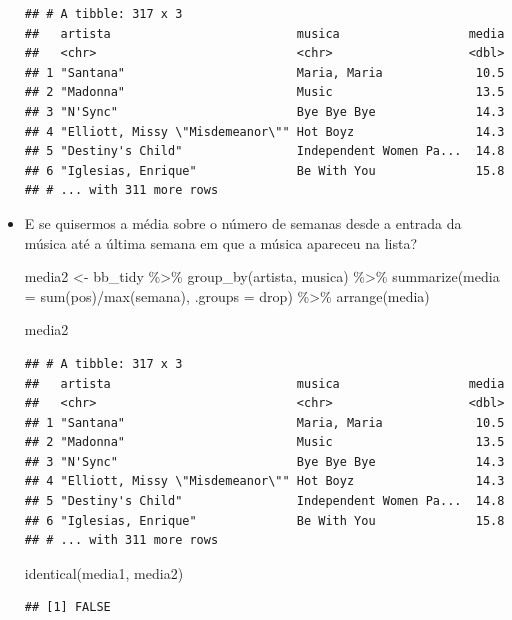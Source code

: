 \documentclass[
  11pt]{report}
\newenvironment{Shaded}{\begin{snugshade}}{\end{snugshade}}
\newcommand{\AttributeTok}[1]{\textcolor[rgb]{0.77,0.63,0.00}{#1}}
\newcommand{\FunctionTok}[1]{\textcolor[rgb]{0.00,0.00,0.00}{#1}}
\newcommand{\NormalTok}[1]{#1}
\newcommand{\OtherTok}[1]{\textcolor[rgb]{0.56,0.35,0.01}{#1}}
\newcommand{\SpecialCharTok}[1]{\textcolor[rgb]{0.00,0.00,0.00}{#1}}
\newcommand{\StringTok}[1]{\textcolor[rgb]{0.31,0.60,0.02}{#1}}
\renewenvironment{Shaded}{
    \begin{mdframed}[%
      roundcorner=2pt,%
      innerleftmargin=5pt,%
      innerrightmargin=5pt,%
      topline=true,%
      leftline=true,%
      rightline=true,%
      bottomline=true,%
      linewidth=0.5pt,%
      linecolor=black!20,%
      backgroundcolor=black!2,%
      skipabove=2ex,%
      skipbelow=2.5ex%
    ]%
  }
  {
    \end{mdframed}
  }
\begin{document}
\begin{itemize}
\begin{verbatim}
## # A tibble: 317 x 3
##   artista                          musica                  media
##   <chr>                            <chr>                   <dbl>
## 1 "Santana"                        Maria, Maria             10.5
## 2 "Madonna"                        Music                    13.5
## 3 "N'Sync"                         Bye Bye Bye              14.3
## 4 "Elliott, Missy \"Misdemeanor\"" Hot Boyz                 14.3
## 5 "Destiny's Child"                Independent Women Pa...  14.8
## 6 "Iglesias, Enrique"              Be With You              15.8
## # ... with 311 more rows
\end{verbatim}
\item
  E se quisermos a média sobre o número de semanas desde a entrada da música até a última semana em que a música apareceu na lista?

\begin{Shaded}
\begin{Highlighting}[]
\NormalTok{media2 }\OtherTok{\textless{}{-}}\NormalTok{ bb\_tidy }\SpecialCharTok{\%\textgreater{}\%} 
  \FunctionTok{group\_by}\NormalTok{(artista, musica) }\SpecialCharTok{\%\textgreater{}\%} 
  \FunctionTok{summarize}\NormalTok{(}\AttributeTok{media =} \FunctionTok{sum}\NormalTok{(pos)}\SpecialCharTok{/}\FunctionTok{max}\NormalTok{(semana), }\AttributeTok{.groups =} \StringTok{\textquotesingle{}drop\textquotesingle{}}\NormalTok{) }\SpecialCharTok{\%\textgreater{}\%} 
  \FunctionTok{arrange}\NormalTok{(media)}

\NormalTok{media2}
\end{Highlighting}
\end{Shaded}

\begin{verbatim}
## # A tibble: 317 x 3
##   artista                          musica                  media
##   <chr>                            <chr>                   <dbl>
## 1 "Santana"                        Maria, Maria             10.5
## 2 "Madonna"                        Music                    13.5
## 3 "N'Sync"                         Bye Bye Bye              14.3
## 4 "Elliott, Missy \"Misdemeanor\"" Hot Boyz                 14.3
## 5 "Destiny's Child"                Independent Women Pa...  14.8
## 6 "Iglesias, Enrique"              Be With You              15.8
## # ... with 311 more rows
\end{verbatim}

\begin{Shaded}
\begin{Highlighting}[]
\FunctionTok{identical}\NormalTok{(media1, media2)}
\end{Highlighting}
\end{Shaded}

\begin{verbatim}
## [1] FALSE
\end{verbatim}
\end{itemize}
\end{document}
